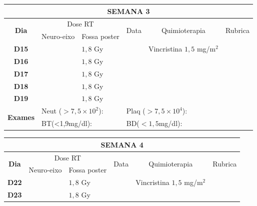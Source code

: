\documentclass[11pt,a4paper,oldfontcommands]{memoir}
\begin{document}
\begin{center}
\begin{longtable}{p{1cm}p{2cm}|p{2cm}|p{1cm}|p{4cm}|p{3cm}}
	\hline
	\multicolumn{6}{c}{\textbf{SEMANA 3}}\\
\hline
    \multicolumn{1}{c|}{\multirow{2}{*}{\textbf{Dia}}}&\multicolumn{2}{c|}{Dose RT}&\multicolumn{1}{c|}{\multirow{2}{*}{Data}}&\multicolumn{1}{c|}{\multirow{2}{*}{Quimioterapia}}&\multicolumn{1}{c}{\multirow{2}{*}{Rubrica}} \\
    \cline{2-3}
    \multicolumn{1}{c|}{\multirow{1}{*}{}}&{Neuro-eixo}&{Fossa poster}&& \\
	\hline
	\multicolumn{1}{c|}{\multirow{1}{*}{\textbf{D15}}}&\multicolumn{1}{c|}{}&{\(1,8\) Gy}&&{Vincristina \(1,5\) mg/m\(^2\)}&\\
    \multicolumn{1}{c|}{\multirow{1}{*}{\textbf{D16}}}&\multicolumn{1}{c|}{}&{\(1,8\) Gy}&&{}&\\    \multicolumn{1}{c|}{\multirow{1}{*}{\textbf{D17}}}&\multicolumn{1}{c|}{}&{\(1,8\) Gy}&&{}&\\
    \multicolumn{1}{c|}{\multirow{1}{*}{\textbf{D18}}}&\multicolumn{1}{c|}{}&{\(1,8\) Gy}&&{}&\\
    \multicolumn{1}{c|}{\multirow{1}{*}{\textbf{D19}}}&\multicolumn{1}{c|}{}&{\(1,8\) Gy}&&{}&\\
    \hline
    \multicolumn{1}{c|}{\multirow{2}{*}{\textbf{Exames}}}&\multicolumn{2}{l|}{Neut (\(>7,5\times10^2\)):}&\multicolumn{2}{l|}{Plaq (\(>7,5\times10^4\)):}&\\
    \cline{2-6}
    \multicolumn{1}{c|}{\multirow{2}{*}{{}}}&\multicolumn{2}{l|}{BT(<1,9mg/dl):}&\multicolumn{2}{l|}{BD(\(<1,5\)mg/dl):}&
    \\
    \hline
\end{longtable}
\begin{longtable}{p{1cm}p{2cm}|p{2cm}|p{1cm}|p{4cm}|p{3cm}}
	\hline
	\multicolumn{6}{c}{\textbf{SEMANA 4}}\\
\hline
    \multicolumn{1}{c|}{\multirow{2}{*}{\textbf{Dia}}}&\multicolumn{2}{c|}{Dose RT}&\multicolumn{1}{c|}{\multirow{2}{*}{Data}}&\multicolumn{1}{c|}{\multirow{2}{*}{Quimioterapia}}&\multicolumn{1}{c}{\multirow{2}{*}{Rubrica}} \\
    \cline{2-3}
    \multicolumn{1}{c|}{\multirow{1}{*}{}}&{Neuro-eixo}&{Fossa poster}&& \\
	\hline
	\multicolumn{1}{c|}{\multirow{1}{*}{\textbf{D22}}}&\multicolumn{1}{c|}{}&{\(1,8\) Gy}&&{Vincristina \(1,5\) mg/m\(^2\)}&\\
    \multicolumn{1}{c|}{\multirow{1}{*}{\textbf{D23}}}&\multicolumn{1}{c|}{}&{\(1,8\) Gy}&&{}&\\

\end{longtable}
\end{center}
\end{document}
